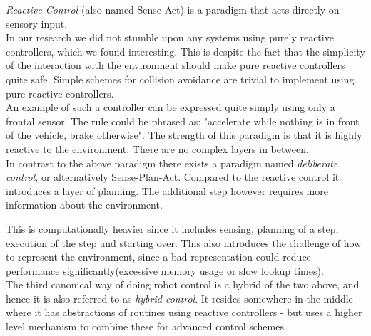 \textit{Reactive Control} (also named Sense-Act) is a paradigm that acts directly on sensory input.\\
In our research we did not stumble upon any systems using purely reactive controllers, which we found interesting. This is despite the fact that the simplicity of the interaction with the environment should make pure reactive controllers quite safe.
Simple schemes for collision avoidance are trivial to implement using pure reactive controllers.\\
An example of such a controller can be expressed quite simply using only a frontal sensor. The rule could be phrased as: "accelerate while nothing is in front of the vehicle, brake otherwise".
The strength of this paradigm is that it is highly reactive to the environment. There are no complex layers in between.\\

In contrast to the above paradigm there exists a paradigm named \textit{deliberate control}, or alternatively Sense-Plan-Act.
Compared to the reactive control it introduces a layer of planning.
The additional step however requires more information about the environment.

This is computationally heavier since it includes sensing, planning of a step, execution of the step and starting over.
This also introduces the challenge of how to represent the environment, since a bad representation could reduce performance significantly(excessive memory usage or slow lookup times).\\

The third canonical way of doing robot control is a hybrid of the two above, and hence it is also referred to as \textit{hybrid control}.
It resides somewhere in the middle where it has abstractions of routines using reactive controllers - but uses a higher level mechanism to combine these for advanced control schemes.\\


\\



